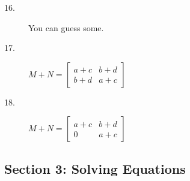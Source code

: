 \documentclass{article}
\begin{document}
\begin{description}
  \item[16.] You can guess some.

  \item[17.] $M + N = \begin{bmatrix} a+c & b+d \\ b+d & a+c \end{bmatrix}$

  \item[18.] $M + N = \begin{bmatrix} a+c & b+d \\ 0 & a+c \end{bmatrix}$

\end{description}


\subsection*{Section 3: Solving Equations}
\end{document}
